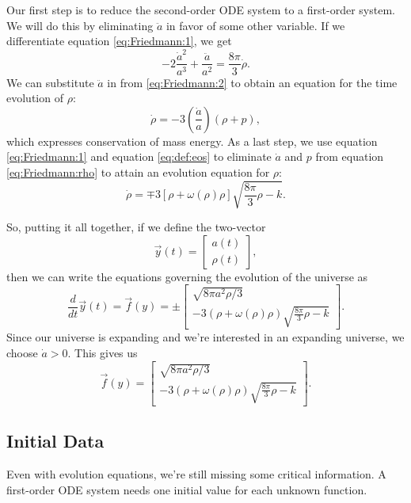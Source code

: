 \documentclass[]{article}
\newcommand{\myvec}[1]{\vec{#1}} %
\newcommand{\dd}[1]{\frac{d}{d #1}}
\newcommand{\ddt}{\dd{t}}
\newcommand{\twovector}[2]{\left[\begin{matrix}#1\\#2\end{matrix}\right]}
\begin{document}
Our first step is to reduce the second-order ODE system to a
first-order system. We will do this by eliminating $\ddot{a}$ in favor
of some other variable. If we differentiate equation
\eqref{eq:Friedmann:1}, we get
\begin{equation}
  \label{eq:dF1}
  -2 \frac{\dot{a}^2}{a^3} + \frac{\ddot{a}}{a^2} = \frac{8\pi}{3}\dot{\rho}.
\end{equation}
We can substitute $\ddot{a}$ in from \eqref{eq:Friedmann:2} to obtain
an equation for the time evolution of $\rho$:
\begin{equation}
  \label{eq:Friedmann:rho}
  \dot{\rho} = - 3 \left(\frac{\dot{a}}{a}\right)\left(\rho + p\right),
\end{equation}
which expresses conservation of mass energy. As a last step, we use
equation \eqref{eq:Friedmann:1} and equation \eqref{eq:def:eos} to
eliminate $\dot{a}$ and $p$ from equation \eqref{eq:Friedmann:rho} to
attain an evolution equation for $\rho$:
\begin{equation}
  \label{eq:rho:evolution}
  \dot{\rho} = \mp 3\left[\rho + \omega(\rho)\rho\right]\sqrt{\frac{8\pi}{3}\rho-k}.
\end{equation}

So, putting it all together, if we define the two-vector
\begin{equation}
  \label{eq:def:y}
  \myvec{y}(t) = \twovector{a(t)}{\rho(t)},
\end{equation}
then we can write the equations governing the evolution of the
universe as
\begin{equation}
  \label{eq:y:prime:orig}
  \ddt \myvec{y}(t) = \myvec{f}(y)
  = \pm\twovector{\sqrt{8\pi a^2\rho/3}}{-3\left(\rho + \omega(\rho)\rho\right)\sqrt{\frac{8\pi}{3}\rho-k}}.
\end{equation}
Since our universe is expanding and we're interested in an expanding
universe, we choose $\dot{a}>0$. This gives us
\begin{equation}
  \label{eq:y:prime}
  \myvec{f}(y) = \twovector{\sqrt{8\pi a^2\rho/3}}{-3\left(\rho + \omega(\rho)\rho\right)\sqrt{\frac{8\pi}{3}\rho-k}}.
\end{equation}

\subsection{Initial Data}
\label{subsec:initial:data}

Even with evolution equations, we're still missing some critical
information. A first-order ODE system needs one initial value for each
unknown function.
\end{document}
